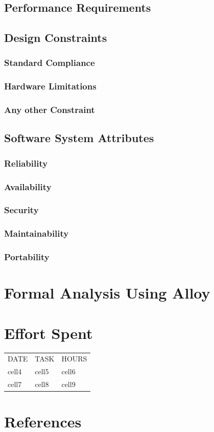 \documentclass[12pt]{article}
\begin{document}
\subsection{Performance Requirements}

\subsection{Design Constraints}
\subsubsection{Standard Compliance}
\subsubsection{Hardware Limitations}
\subsubsection{Any other Constraint}

\subsection{Software System Attributes}
\subsubsection{Reliability}
\subsubsection{Availability}
\subsubsection{Security}
\subsubsection{Maintainability}
\subsubsection{Portability}

\section{Formal Analysis Using Alloy}

\section{Effort Spent}

\begin{center}
\begin{tabular}{ |l|l|l| } 
 \hline
 DATE & TASK & HOURS \\ 
 cell4 & cell5 & cell6 \\ 
 cell7 & cell8 & cell9 \\ 
 \hline
\end{tabular}
\end{center}

\section{References}
\end{document}
